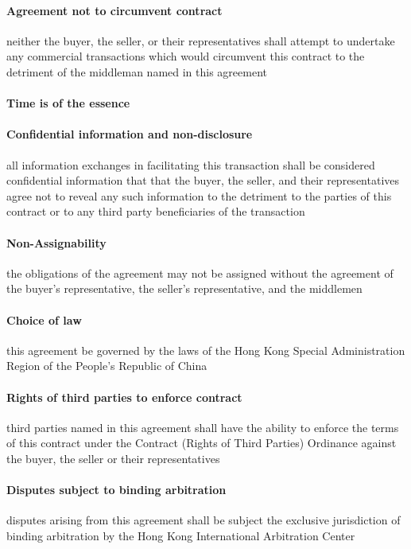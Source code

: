 \documentclass[10pt]{article}
\begin{document}
\paragraph{Agreement not to circumvent contract} neither the buyer,
the seller, or their representatives shall attempt to undertake any
commercial transactions which would circumvent this contract to the
detriment of the middleman named in this agreement

\paragraph{Time is of the essence}

\paragraph{Confidential information and non-disclosure} all
information exchanges in facilitating this transaction shall be
considered confidential information that that the buyer, the seller,
and their representatives agree not to reveal any such information to
the detriment to the parties of this contract or to any third party
beneficiaries of the transaction

\paragraph{Non-Assignability} the obligations of the agreement may not
be assigned without the agreement of the buyer's representative, the
seller's representative, and the middlemen

\paragraph{Choice of law} this agreement be governed by the laws of
the Hong Kong Special Administration Region of the People’s Republic
of China

\paragraph{Rights of third parties to enforce contract} third parties
named in this agreement shall have the ability to enforce the terms of
this contract under the Contract (Rights of Third Parties) Ordinance
against the buyer, the seller or their representatives

\paragraph{Disputes subject to binding arbitration} disputes arising
from this agreement shall be subject the exclusive jurisdiction of
binding arbitration by the Hong Kong International Arbitration Center
\end{document}
